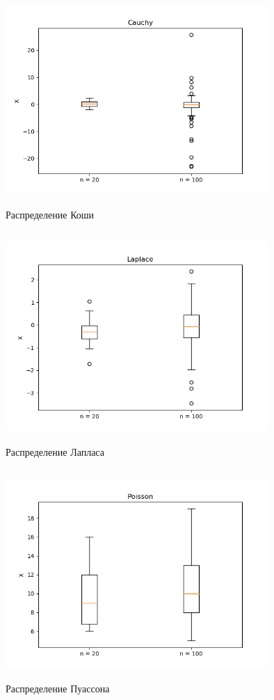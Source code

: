 \documentclass[../body.tex]{subfiles}
\begin{document}
\begin{figure}[H]
	\centering
	\includegraphics[width = 10cm, height = 8cm]{img/Cauchy_boxplot.png}
	\caption{Распределение Коши}
	\label{fig:cauchy_boxplot}
\end{figure}


\begin{figure}[H]
	\centering
	\includegraphics[width = 10cm, height = 8cm]{img/Laplace_boxplot.png}
	\caption{Распределение Лапласа}
	\label{fig:laplace_boxplot}
\end{figure}


\begin{figure}[H]
	\centering
	\includegraphics[width = 10cm, height = 8cm]{img/Poisson_boxplot.png}
	\caption{Распределение Пуассона}
	\label{fig:poisson_boxplot}
\end{figure}
\end{document}
